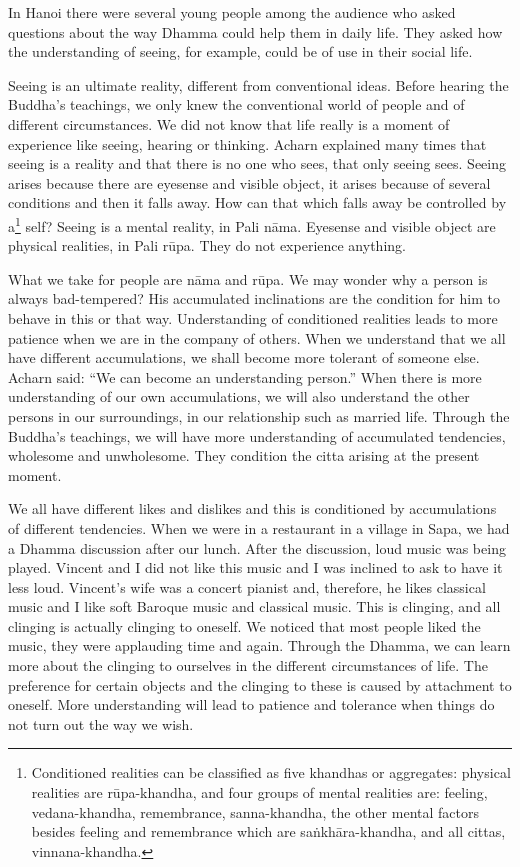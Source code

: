 In Hanoi there were several young people among the audience who asked questions about the way Dhamma could help them in daily life. They asked how the 
understanding of seeing, for example, could be of use in their social life. 

Seeing is an ultimate reality, different from conventional ideas. Before hearing 
the Buddha's teachings, we only knew the conventional world of people and of 
different circumstances. We did not know that life really is a moment of experience like seeing, hearing or thinking. Acharn explained many times that seeing 
is a reality and that there is no one who sees, that only seeing sees. Seeing arises 
because there are eyesense and visible object, it arises because of several conditions and then it falls away. How can that which falls away be controlled by a\footnote{Conditioned realities can be classified as five khandhas or aggregates: physical realities are 
rūpa-khandha, and four groups of mental realities are: feeling, vedana-khandha, remembrance, sanna-khandha, the other mental factors besides feeling and remembrance which are 
saṅkhāra-khandha, and all cittas, vinnana-khandha.}
self? Seeing is a mental reality, in Pali nāma. Eyesense and visible object are physical realities, in Pali rūpa. They do not experience anything. 

What we take for people are nāma and rūpa. We may wonder why a person is 
always bad-tempered? His accumulated inclinations are the condition for him to 
behave in this or that way. Understanding of conditioned realities leads to more 
patience when we are in the company of others. When we understand that we all 
have different accumulations, we shall become more tolerant of someone else. 
Acharn said: ``We can become an understanding person.'' When there is more 
understanding of our own accumulations, we will also understand the other persons in our surroundings, in our relationship such as married life. Through the 
Buddha's teachings, we will have more understanding of accumulated tendencies, wholesome and unwholesome. They condition the citta arising at the present moment. 

We all have different likes and dislikes and this is conditioned by accumulations 
of different tendencies. When we were in a restaurant in a village in Sapa, we 
had a Dhamma discussion after our lunch. After the discussion, loud music was 
being played. Vincent and I did not like this music and I was inclined to ask to 
have it less loud. Vincent's wife was a concert pianist and, therefore, he likes 
classical music and I like soft Baroque music and classical music. This is clinging, and all clinging is actually clinging to oneself. We noticed that most people 
liked the music, they were applauding time and again. Through the Dhamma, 
we can learn more about the clinging to ourselves in the different circumstances 
of life. The preference for certain objects and the clinging to these is caused by 
attachment to oneself. More understanding will lead to patience and tolerance 
when things do not turn out the way we wish. 


